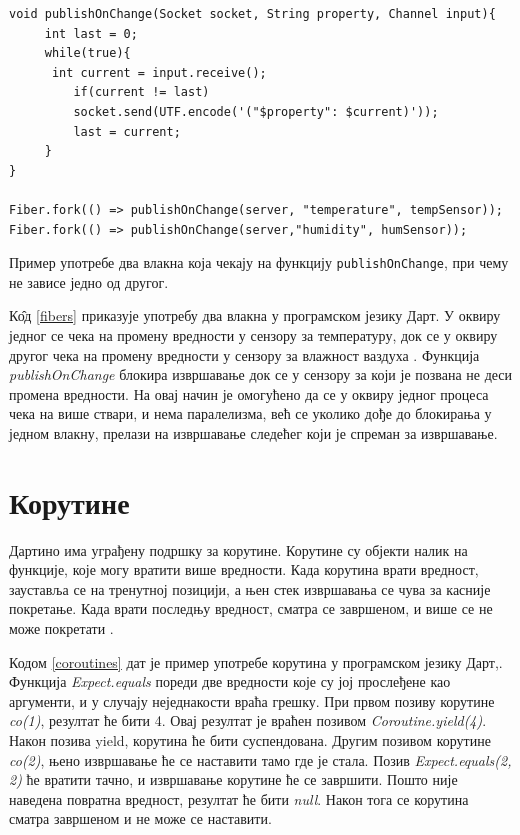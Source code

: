 \documentclass[12pt,oneside]{memoir}
\begin{document}
\begin{listing}
\begin{verbatim}
void publishOnChange(Socket socket, String property, Channel input){
  	 int last = 0;
  	 while(true){
   	  int current = input.receive();
    	 if(current != last)
      	 socket.send(UTF.encode('("$property": $current)'));
    	 last = current;
  	 }
}

Fiber.fork(() => publishOnChange(server, "temperature", tempSensor));
Fiber.fork(() => publishOnChange(server,"humidity", humSensor));
\end{verbatim}
\caption{Пример употребе два влакна која чекају на функцију \texttt{publishOnChange}, при чему не зависе једно од другог.}
\label{fibers}
\end{listing}

К\^{о}д \ref{fibers} приказује употребу два влакна у програмском језику Дарт. У оквиру једног се чека на промену вредности у сензору за температуру, док се у оквиру другог чека на промену вредности у сензору за влажност ваздуха \cite{Dartino}. Функција \textit{publishOnChange} блокира извршавање док се у сензору за који је позвана не деси промена вредности. На овај начин је омогућено да се у оквиру једног процеса чека на више ствари, и нема паралелизма, већ се уколико дође до блокирања у једном влакну, прелази на извршавање следећег који је спреман за извршавање.

\section{Корутине}
\label{korutine}

Дартино има уграђену подршку за корутине. Корутине су објекти налик на функције, које могу вратити више вредности. Када корутина врати вредност, зауставља се на тренутној позицији, а њен стек извршавања се чува за касније покретање. Када врати последњу вредност, сматра се завршеном, и више се не може покретати  \cite{korutine_i_vlakna}.

Кодом \ref{coroutines} дат је пример употребе корутина у програмском језику Дарт,. Функција \textit{Expect.equals} пореди две вредности које су јој прослеђене као аргументи, и у случају неједнакости враћа грешку. При првом позиву корутине \textit{co(1)}, резултат ће бити 4. Овај резултат је враћен позивом \textit{Coroutine.yield(4)}. Након позива yield, корутина ће бити суспендована. Другим позивом корутине \textit{co(2)}, њено извршавање ће се наставити тамо где је стала. Позив \textit{Expect.equals(2, 2)} ће вратити тачно, и извршавање корутине ће се завршити. Пошто није наведена повратна вредност, резултат ће бити \textit{null}. Након тога се корутина сматра завршеном и не може се наставити.
\end{document}
